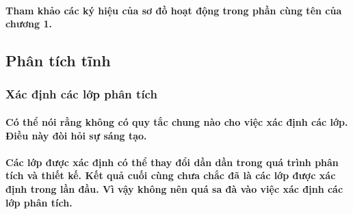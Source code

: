 \documentclass{article}
\begin{document}
      \paragraph{\textnormal{
        Tham khảo các ký hiệu của sơ đồ hoạt động trong phần cùng tên của chương 1.
      }}

  \subsection{Phân tích tĩnh}
    \subsubsection{Xác định các lớp phân tích}
      \paragraph{\textnormal{
        Có thể nói rằng không có quy tắc chung nào cho việc xác định các lớp. Điều này đòi hỏi sự sáng tạo.
      }}

      \paragraph{\textnormal{
        Các lớp được xác định có thể thay đổi dần dần trong quá trình phân tích và thiết kế. Kết quả cuối cùng chưa chắc đã là các lớp được xác định trong lần đầu. Vì vậy không nên quá sa đà vào việc xác định các lớp phân tích.
      }}
\end{document}
